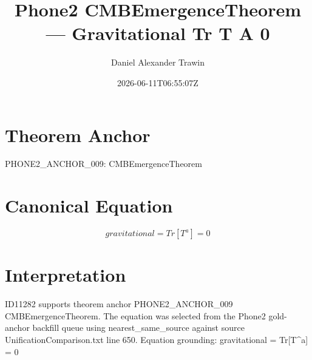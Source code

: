 \documentclass[11pt]{article}
\title{Phone2 CMBEmergenceTheorem — Gravitational Tr T A 0}
\author{Daniel Alexander Trawin}
\date{2026-06-11T06:55:07Z}
\begin{document}
\maketitle
\section*{Theorem Anchor}
PHONE2_ANCHOR_009: CMBEmergenceTheorem
\section*{Canonical Equation}
\[
gravitational = Tr[T^a] = 0
\]
\section*{Interpretation}
ID11282 supports theorem anchor PHONE2_ANCHOR_009 CMBEmergenceTheorem. The equation was selected from the Phone2 gold-anchor backfill queue using nearest_same_source against source UnificationComparison.txt line 650. Equation grounding: gravitational = Tr[T^a] = 0
\end{document}
